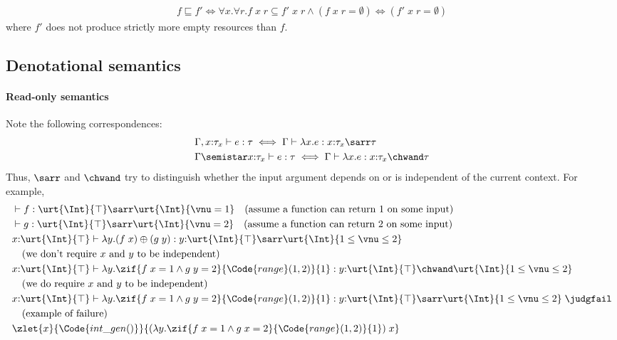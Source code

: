 \begin{definition}
  \begin{align*}
    f \sqsubseteq f' \iff \forall x.\forall r. f\;x\;r \subseteq f'\;x\;r \land (f\;x\;r = \emptyset) \iff (f'\;x\;r = \emptyset) 
  \end{align*}\noindent
where $f'$ does not produce strictly more empty resources than $f$.
\end{definition}

\newpage
\subsection{Denotational semantics}

\paragraph{Read-only semantics} Note the following correspondences:
\begin{align*}
  &\Gamma, x{:}\tau_x \vdash e : \tau \iff \Gamma\vdash \lambda x.e : x{:}\tau_x \sarr \tau
  \\&\Gamma \semistar x{:}\tau_x \vdash e : \tau \iff \Gamma\vdash \lambda x.e : x{:}\tau_x \chwand \tau
\end{align*}\noindent
Thus, $\sarr$ and $\chwand$ try to distinguish whether the input argument depends on or is independent of the current context. For example,
\begin{align*}
&\vdash f : \urt{\Int}{\top}\sarr \urt{\Int}{\vnu = 1} \quad \text{(assume a function can return $1$ on some input)}\\
&\vdash g : \urt{\Int}{\top}\sarr \urt{\Int}{\vnu = 2} \quad \text{(assume a function can return $2$ on some input)}\\
&x{:}\urt{\Int}{\top} \vdash \lambda y. (f\;x) \oplus (g\;y) : y{:}\urt{\Int}{\top} \sarr \urt{\Int}{1 \leq \vnu \leq 2} \\
&\quad \text{(we don't require $x$ and $y$ to be independent)} \\
&x{:}\urt{\Int}{\top} \vdash \lambda y. \zif{f\;x = 1 \land g\;y = 2}{\Code{range}(1,2)}{1} : y{:}\urt{\Int}{\top} \chwand \urt{\Int}{1 \leq \vnu \leq 2} \\
&\quad \text{(we do require $x$ and $y$ to be independent)} \\
&x{:}\urt{\Int}{\top} \vdash \lambda y. \zif{f\;x = 1 \land g\;y = 2}{\Code{range}(1,2)}{1} : y{:}\urt{\Int}{\top} \sarr \urt{\Int}{1 \leq \vnu \leq 2} \;\judgfail \\
&\quad \text{(example of failure)} \\
&\zlet{x}{\Code{int\_gen()}}{
(\lambda y. \zif{f\;x = 1 \land g\;x = 2}{\Code{range}(1,2)}{1})\;x}
\end{align*}\noindent
